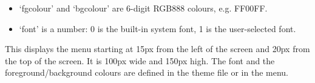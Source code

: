   \begin{itemize}
    \item `fgcolour' and `bgcolour' are 6-digit RGB888 colours, e.g. FF00FF.
    \item `font' is a number: 0 is the built-in system font, 1 is the
    user-selected font.
  \end{itemize}

\begin{example}
\end{example}
This displays the menu starting at 15px from the left of the screen and 20px
from the top of the screen.  It is 100px wide and 150px high.
The font and the foreground/background colours are defined in the theme
 file or in the  menu.

